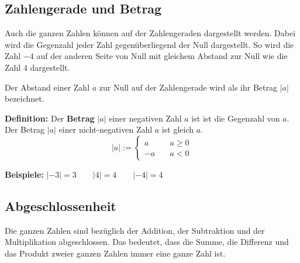 \subsection{Zahlengerade und Betrag}

Auch die ganzen Zahlen können auf der Zahlengeraden dargestellt werden. Dabei wird die Gegenzahl jeder Zahl gegenüberliegend der Null dargestellt. So wird die Zahl $-4$ auf der anderen Seite von Null mit gleichem Abstand zur Null wie die Zahl $4$ dargestellt.
\begin{center}
\end{center}

Der Abstand einer Zahl $a$ zur Null auf der Zahlengerade wird als ihr Betrag $|a|$ bezeichnet.

\textbf{Definition:} Der \textbf{Betrag} $|a|$ einer negativen Zahl $a$ ist ist die Gegenzahl von $a$. Der Betrag $|a|$ einer nicht-negativen Zahl $a$ ist gleich $a$.
\[
  |a| := \begin{cases}
    a &\quad a \geq 0 \\
    -a &\quad a < 0
  \end{cases}
\]
\begin{example}
  \textbf{Beispiele:} $|-3| = 3 \qquad |4| = 4 \qquad |-4| = 4$
\end{example}

\subsection{Abgeschlossenheit}

Die ganzen Zahlen sind bezüglich der Addition, der Subtraktion und der Multiplikation abgeschlossen. Das bedeutet, dass die Summe, die Differenz und das Produkt zweier ganzen Zahlen immer eine ganze Zahl ist.

